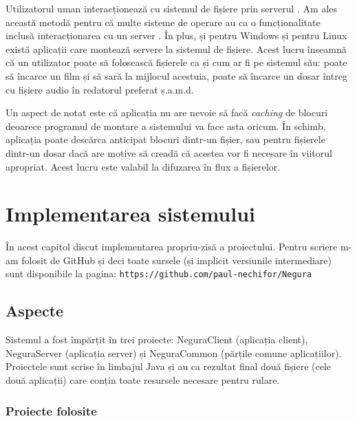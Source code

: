 \documentclass[a4wide,12pt]{report}
\newcommand{\eng}[1]{\emph{#1}} %
\newcommand{\url}[1]{\texttt{#1}}
\newcommand{\acr}[1]{{\textsmaller[1]{\textsc{#1}}}} %
\begin{document}
Utilizatorul uman interacționează cu sistemul de fișiere prin serverul \acr{FTP}. Am ales această metodă pentru că multe
sisteme de operare au ca o funcționalitate inclusă interacționarea cu un server \acr{FTP}. În plus, și pentru Windows și
pentru Linux există aplicații care montează servere \acr{FTP} la sistemul de fișiere. Acest lucru înseamnă că un
utilizator poate să folosească fișierele ca și cum ar fi pe sistemul său: poate să încarce un film și să sară la
mijlocul acestuia, poate să încarce un dosar întreg cu fișiere audio în redatorul preferat ș.a.m.d.

Un aspect de notat este că aplicația nu are nevoie să facă \eng{caching} de blocuri deoarece programul de montare a
sistemului \acr{FTP} va face asta oricum. În schimb, aplicația poate descărca anticipat blocuri dintr-un fișier, sau
pentru fișierele dintr-un dosar dacă are motive să creadă că acestea vor fi necesare în viitorul apropriat. Acest lucru
este valabil la difuzarea în flux a fișierelor.

\chapter{Implementarea sistemului}

În acest capitol discut implementarea propriu-zisă a proiectului. Pentru scriere m-am folosit de GitHub și deci toate
sursele (și implicit versiunile intermediare) sunt disponibile la pagina: \url{https://github.com/paul-nechifor/Negura}

\section{Aspecte} %

Sistemul a fost împărțit în trei proiecte: NeguraClient (aplicația client), NeguraServer (aplicația server) și
NeguraCommon (părțile comune aplicațiilor). Proiectele sunt scrise în limbajul Java și au ca rezultat final două fișiere
\acr{JAR} (cele două aplicații) care conțin toate resursele necesare pentru rulare.

\subsection{Proiecte folosite} %
\end{document}
